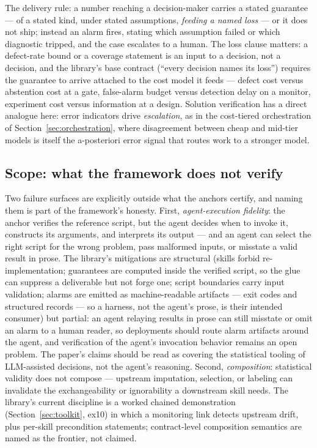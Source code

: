 \documentclass[11pt,a4paper]{article}
\begin{document}
The delivery rule: a number reaching a decision-maker carries a stated
guarantee --- of a stated kind, under stated assumptions, \emph{feeding a
named loss} --- or it does not ship; instead an alarm fires, stating which
assumption failed or which diagnostic tripped, and the case escalates to a
human. The loss clause matters: a defect-rate bound or a coverage
statement is an input to a decision, not a decision, and the library's
base contract (``every decision names its loss'') requires the guarantee
to arrive attached to the cost model it feeds --- defect cost versus
abstention cost at a gate, false-alarm budget versus detection delay on a
monitor, experiment cost versus information at a design. Solution
verification has a direct analogue here: error indicators drive
\emph{escalation}, as in the cost-tiered orchestration of
Section~\ref{sec:orchestration}, where disagreement between cheap and
mid-tier models is itself the a-posteriori error signal that routes work
to a stronger model.

\subsection{Scope: what the framework does not verify}
\label{sec:scope}

Two failure surfaces are explicitly outside what the anchors certify, and
naming them is part of the framework's honesty. First,
\emph{agent-execution fidelity}: the anchor verifies the reference script,
but the agent decides when to invoke it, constructs its arguments, and
interprets its output --- and an agent can select the right script for the
wrong problem, pass malformed inputs, or misstate a valid result in prose.
The library's mitigations are structural (skills forbid re-implementation;
guarantees are computed inside the verified script, so the glue can
suppress a deliverable but not forge one; script boundaries carry input
validation; alarms are emitted as machine-readable artifacts --- exit
codes and structured records --- so a harness, not the agent's prose, is
their intended consumer) but partial: an agent relaying results in prose
can still misstate or omit an alarm to a human reader, so deployments
should route alarm artifacts around the agent, and verification of the
agent's invocation behavior remains an open problem. The paper's claims
should be read as covering the statistical tooling of LLM-assisted
decisions, not the agent's reasoning.
Second, \emph{composition}: statistical validity does not compose ---
upstream imputation, selection, or labeling can invalidate the
exchangeability or ignorability a downstream skill needs. The library's
current discipline is a worked chained demonstration
(Section~\ref{sec:toolkit}, ex10) in which a monitoring link detects
upstream drift, plus per-skill precondition statements; contract-level
composition semantics are named as the frontier, not claimed.
\end{document}
